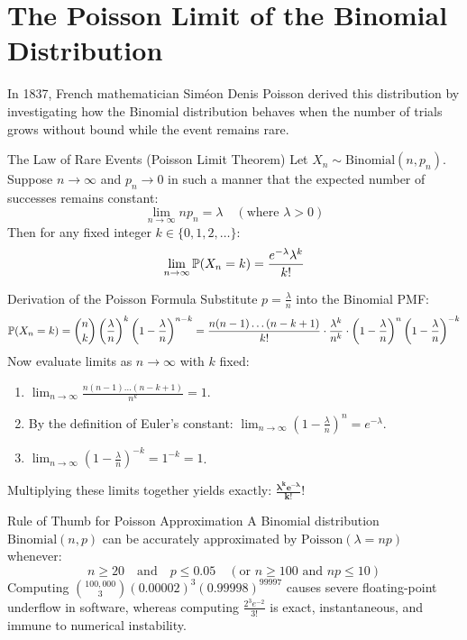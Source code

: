 \section{The Poisson Limit of the Binomial Distribution}

In 1837, French mathematician Siméon Denis Poisson derived this distribution by investigating how the Binomial distribution behaves when the number of trials grows without bound while the event remains rare.

\begin{theorembox}{The Law of Rare Events (Poisson Limit Theorem)}
Let $X_n \sim \text{Binomial}(n, p_n)$. Suppose $n \to \infty$ and $p_n \to 0$ in such a manner that the expected number of successes remains constant:
$$\lim_{n \to \infty} n p_n = \lambda \quad (\text{where } \lambda > 0)$$
Then for any fixed integer $k \in \{0, 1, 2, \dots\}$:
$$\lim_{n \to \infty} \P(X_n = k) = \frac{e^{-\lambda}\lambda^k}{k!}$$
\end{theorembox}

\begin{intuitionbox}{Derivation of the Poisson Formula}
Substitute $p = \frac{\lambda}{n}$ into the Binomial PMF:
$$\P(X_n = k) = \binom{n}{k} \left(\frac{\lambda}{n}\right)^k \left(1 - \frac{\lambda}{n}\right)^{n - k} = \frac{n(n-1)\dots(n-k+1)}{k!} \cdot \frac{\lambda^k}{n^k} \cdot \left(1 - \frac{\lambda}{n}\right)^n \left(1 - \frac{\lambda}{n}\right)^{-k}$$
Now evaluate limits as $n \to \infty$ with $k$ fixed:
\begin{enumerate}
    \item $\lim_{n \to \infty} \frac{n(n-1)\dots(n-k+1)}{n^k} = 1$.
    \item By the definition of Euler's constant: $\lim_{n \to \infty} \left(1 - \frac{\lambda}{n}\right)^n = e^{-\lambda}$.
    \item $\lim_{n \to \infty} \left(1 - \frac{\lambda}{n}\right)^{-k} = 1^{-k} = 1$.
\end{enumerate}
Multiplying these limits together yields exactly: $\mathbf{\frac{\lambda^k e^{-\lambda}}{k!}}$!
\end{intuitionbox}

\begin{theorembox}{Rule of Thumb for Poisson Approximation}
A Binomial distribution $\text{Binomial}(n, p)$ can be accurately approximated by $\text{Poisson}(\lambda = np)$ whenever:
$$n \ge 20 \quad \text{and} \quad p \le 0.05 \quad (\text{or } n \ge 100 \text{ and } np \le 10)$$
Computing $\binom{100{,}000}{3}(0.00002)^3 (0.99998)^{99997}$ causes severe floating-point underflow in software, whereas computing $\frac{2^3 e^{-2}}{3!}$ is exact, instantaneous, and immune to numerical instability.
\end{theorembox}

